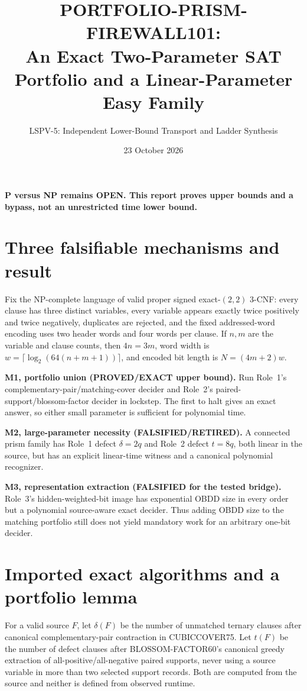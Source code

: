 \documentclass[11pt]{article}
\title{PORTFOLIO-PRISM-FIREWALL101:\\An Exact Two-Parameter SAT Portfolio and a Linear-Parameter Easy Family}
\author{LSPV-5: Independent Lower-Bound Transport and Ladder Synthesis}
\date{23 October 2026}
\begin{document}
\maketitle
\begin{center}
\textbf{P versus NP remains OPEN. This report proves upper bounds and a bypass, not an unrestricted time lower bound.}
\end{center}

\section{Three falsifiable mechanisms and result}
Fix the NP-complete language of valid proper signed exact-$(2,2)$ 3-CNF:
every clause has three distinct variables, every variable appears exactly
twice positively and twice negatively, duplicates are rejected, and the
fixed addressed-word encoding uses two header words and four words per
clause.  If $n,m$ are the variable and clause counts, then $4n=3m$,
word width is
\(w=\lceil\log_2(64(n+m+1))\rceil\), and encoded bit length is
\(N=(4m+2)w\).

\noindent\textbf{M1, portfolio union (PROVED/EXACT upper bound).}
Run Role~1's complementary-pair/matching-cover decider and Role~2's
paired-support/blossom-factor decider in lockstep.  The first to halt gives
an exact answer, so either small parameter is sufficient for polynomial
time.

\noindent\textbf{M2, large-parameter necessity (FALSIFIED/RETIRED).}
A connected prism family has Role~1 defect $\delta=2q$ and Role~2 defect
$t=8q$, both linear in the source, but has an explicit linear-time witness
and a canonical polynomial recognizer.

\noindent\textbf{M3, representation extraction (FALSIFIED for the tested
bridge).} Role~3's hidden-weighted-bit image has exponential OBDD size in
every order but a polynomial source-aware exact decider.  Thus adding OBDD
size to the matching portfolio still does not yield mandatory work for an
arbitrary one-bit decider.

\section{Imported exact algorithms and a portfolio lemma}
For a valid source $F$, let $\delta(F)$ be the number of unmatched ternary
clauses after canonical complementary-pair contraction in CUBICCOVER75.
Let $t(F)$ be the number of defect clauses after BLOSSOM-FACTOR60's
canonical greedy extraction of all-positive/all-negative paired supports,
never using a source variable in more than two selected support records.
Both are computed from the source and neither is defined from observed
runtime.
\end{document}
